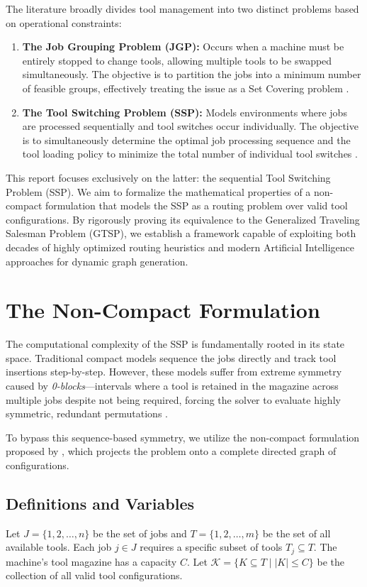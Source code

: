 \documentclass[12pt]{article}
\begin{document}
	The literature broadly divides tool management into two distinct problems based on operational constraints:
	\begin{enumerate}
		\item \textbf{The Job Grouping Problem (JGP):} Occurs when a machine must be entirely stopped to change tools, allowing multiple tools to be swapped simultaneously. The objective is to partition the jobs into a minimum number of feasible groups, effectively treating the issue as a Set Covering problem \parencite{Crama1994}.
		\item \textbf{The Tool Switching Problem (SSP):} Models environments where jobs are processed sequentially and tool switches occur individually. The objective is to simultaneously determine the optimal job processing sequence and the tool loading policy to minimize the total number of individual tool switches \parencite{Catanzaro2015}.
	\end{enumerate}
	
	This report focuses exclusively on the latter: the sequential Tool Switching Problem (SSP). We aim to formalize the mathematical properties of a non-compact formulation that models the SSP as a routing problem over valid tool configurations. By rigorously proving its equivalence to the Generalized Traveling Salesman Problem (GTSP), we establish a framework capable of exploiting both decades of highly optimized routing heuristics and modern Artificial Intelligence approaches for dynamic graph generation.
	
	\section{The Non-Compact Formulation}
	
	The computational complexity of the SSP is fundamentally rooted in its state space. Traditional compact models sequence the jobs directly and track tool insertions step-by-step. However, these models suffer from extreme symmetry caused by \textit{0-blocks}---intervals where a tool is retained in the magazine across multiple jobs despite not being required, forcing the solver to evaluate highly symmetric, redundant permutations \parencite{Catanzaro2015, Laporte2004}.
	
	To bypass this sequence-based symmetry, we utilize the non-compact formulation proposed by \textcite{Colares2026}, which projects the problem onto a complete directed graph of configurations.
	
	\subsection{Definitions and Variables}
	Let $J = \{1, 2, \dots, n\}$ be the set of jobs and $T = \{1, 2, \dots, m\}$ be the set of all available tools. Each job $j \in J$ requires a specific subset of tools $T_j \subseteq T$. The machine's tool magazine has a capacity $C$. Let $\mathcal{K} = \{K \subseteq T \mid |K| \le C\}$ be the collection of all valid tool configurations. 
	
\end{document}
